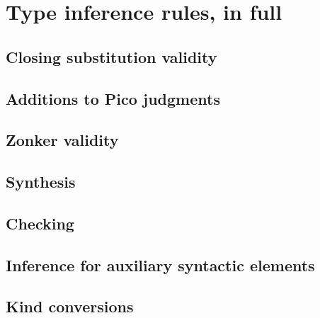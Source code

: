 \chapter{Type inference rules, in full}
\label{app:inference-rules}

\renewcommand{\ottusedrule}[1]{\[#1\]\\[-1ex]}

\section{Closing substitution validity}

\ottdefnSubst{}

\section{Additions to Pico judgments}

\ottdefnUTy{}
\ottdefnUCo{}
\ottdefnUCtx{}

\section{Zonker validity}

\ottdefnZonk{}

\section{Synthesis}

\ottdefnIITy{}
\ottdefnIITyS{}

\section{Checking}

\ottdefnIITyDown{}
\ottdefnIITyDownS{}
\ottdefnIITyDownPoly{}

\section{Inference for auxiliary syntactic elements}

\ottdefnIIArg{}
\ottdefnIIAlt{}
\ottdefnIIAltC{}
\ottdefnIIQVar{}
\ottdefnIIAQVar{}
\ottdefnIIAQVarC{}
\ottdefnIIQuant{}

\section{Kind conversions}

\ottdefnIIFun{}
\ottdefnIIScrut{}


